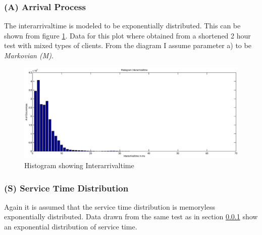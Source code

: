 \documentclass[a4paper]{article}
\begin{document}
\subsubsection{(A) Arrival Process}
\label{subsub:ArrivalProcess}

The interarrivaltime is modeled to be exponentially distributed. This can be shown from figure \ref{fig:interarrivaltime}. Data for this plot where obtained from a shortened 2 hour test with mixed types of clients. From the diagram I assume parameter a) to be \textit{Markovian (M)}.



\begin{figure}[H]
	\begin{center}
    \includegraphics[scale=0.6]{../plots-ms2-mg/interarrivaltime.eps}
  \end{center}
  \caption{Histogram showing Interarrivaltime}
  \label{fig:interarrivaltime}
\end{figure}



\subsubsection{(S) Service Time Distribution }

Again it is assumed that the service time distribution is memoryless exponentially distributed. Data drawn from the same test as in section \ref{subsub:ArrivalProcess} show an exponential distribution of service time.

\end{document}
